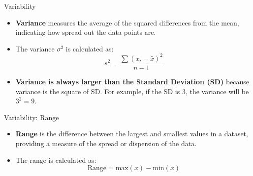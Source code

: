 \documentclass[
  ignorenonframetext,
]{beamer}
\providecommand{\tightlist}{%
  \setlength{\itemsep}{0pt}\setlength{\parskip}{0pt}}
\begin{document}
\begin{frame}{Variability}
\label{variability-1}
\begin{itemize}
\tightlist
\item
  \textbf{Variance} measures the average of the squared differences from
  the mean, indicating how spread out the data points are.
\end{itemize}

\begin{itemize}
\tightlist
\item
  The variance \(\sigma^2\) is calculated as:
  \[s^2 = \frac{\sum (x_i - \bar{x})^2}{n - 1}\]
\end{itemize}

\begin{itemize}
\tightlist
\item
  \textbf{Variance is always larger than the Standard Deviation (SD)}
  because variance is the square of SD. For example, if the SD is 3, the
  variance will be \(3^2 = 9\).
\end{itemize}
\end{frame}

\begin{frame}{Variability: Range}
\label{variability-range}
\begin{itemize}
\tightlist
\item
  \textbf{Range} is the difference between the largest and smallest
  values in a dataset, providing a measure of the spread or dispersion
  of the data.
\end{itemize}

\begin{itemize}
\tightlist
\item
  The range is calculated as:
  \[\text{Range} = \text{max}(x) - \text{min}(x)\]
\end{itemize}
\end{frame}
\end{document}
